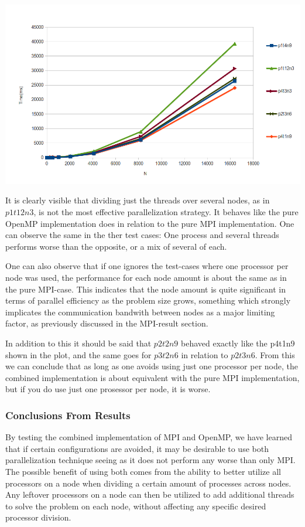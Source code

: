 \documentclass[fontsize=11pt,paper=a4,titlepage]{article}
\begin{document}
\hspace*{-2.3cm}\includegraphics[scale=0.73]{pics/plot.png}

It is clearly visible that dividing just the threads over several nodes, as in
$p1t12n3$, is not the most effective parallelization strategy. It behaves like
the pure OpenMP implementation does in relation to the pure MPI implementation.
One can observe the same in the ther test cases: One process and several threads
performs worse than the opposite, or a mix of several of each.

One can also observe that if one ignores the test-cases where one processor per
node was used, the performance for each node amount is about the same as in the
pure MPI-case. This indicates that the node amount is quite significant in terms
of parallel efficiency as the problem size grows, something which strongly
implicates the communication bandwith between nodes as a major limiting factor,
as previously discussed in the MPI-result section.

In addition to this it should be said that $p2t2n9$ behaved exactly like the
p4t1n9 shown in the plot, and the same goes for $p3t2n6$ in relation to
$p2t3n6$. From this we can conclude that as long as one avoids using just one
processor per node, the combined implementation is about equivalent with the
pure MPI implementation, but if you do use just one prosessor per node, it is
worse.

\subsubsection{Conclusions From Results}

By testing the combined implementation of MPI and OpenMP, we have learned that
if certain configurations are avoided, it may be desirable to use both
parallelization technique seeing as it does not perform any worse than only MPI.
The possible benefit of using both comes from the ability to better utilize all
processors on a node when dividing a certain amount of processes across nodes.
Any leftover processors on a node can then be utilized to add additional threads
to solve the problem on each node, without affecting any specific desired
processor division.
\end{document}
